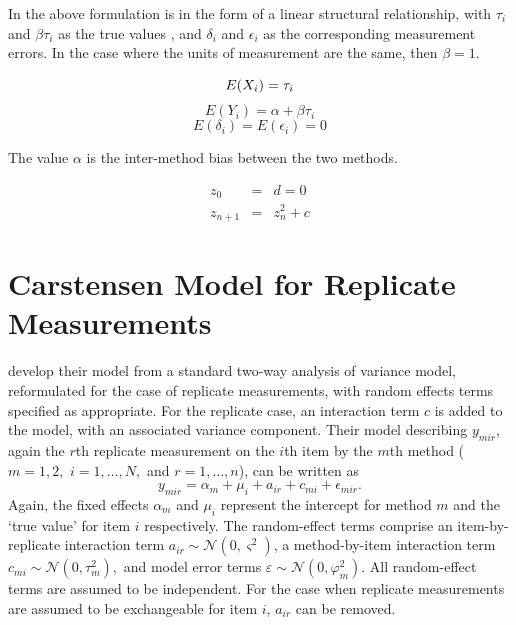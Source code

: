 \documentclass[12pt, a4paper]{report}
\theoremstyle{plain}
\theoremstyle{definition}
\theoremstyle{remark}
\begin{document}
In the above formulation is in the form of a linear structural
relationship, with $\tau_{i}$ and $\beta\tau_{i}$ as the true
values , and $\delta_{i}$ and $\epsilon_{i}$ as the corresponding
measurement errors. In the case where the units of measurement are
the same, then $\beta =1$.

\begin{equation}
E(X_{i}) = \tau_{i}\\
\end{equation}
\begin{equation}
E(Y_{i}) = \alpha +\beta\tau_{i} \nonumber
\end{equation}
\begin{equation}
E(\delta_{i}) = E(\epsilon_{i}) = 0 \nonumber
\end{equation}

The value $\alpha$ is the inter-method bias between the two
methods.

\begin{eqnarray}
z_0 &=& d = 0 \\
z_{n+1} &=& z_n^2+c
\end{eqnarray}




\section{Carstensen Model for Replicate Measurements}


\citet{BXC2008} develop their model from a standard two-way analysis of variance model, reformulated for the case of replicate measurements, with random effects terms specified as appropriate. 
For the replicate case, an interaction term $c$ is added to the model, with an associated variance component. Their model describing $y_{mir} $, again the $r$th replicate measurement on the $i$th item by the $m$th method ($m=1,2,$ $i=1,\ldots,N,$ and $r = 1,\ldots,n$), can be written as
\begin{equation}\label{BXC-model}
y_{mir}  = \alpha_{m} + \mu_{i} + a_{ir} + c_{mi} + \epsilon_{mir}.
\end{equation}
Again, the fixed effects $\alpha_{m}$ and $\mu_{i}$  represent the intercept for method $m$ and the `true value' for item $i$ respectively. The random-effect terms comprise an item-by-replicate interaction term $a_{ir} \sim \mathcal{N}(0,\varsigma^{2})$, a method-by-item interaction term $c_{mi} \sim \mathcal{N}(0,\tau^{2}_{m}),$ and model error terms $\varepsilon \sim \mathcal{N}(0,\varphi^{2}_{m}).$ All random-effect terms are assumed to be independent. For the case when replicate measurements are assumed to be exchangeable for item $i$, $a_{ir}$ can be removed.
\end{document}
